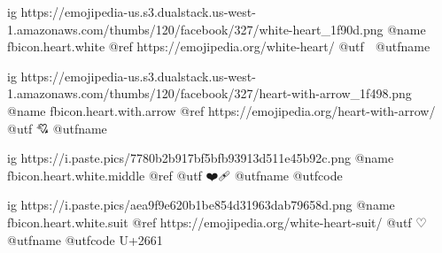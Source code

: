  
 
 
 
 

\ifcmt
	ig https://emojipedia-us.s3.dualstack.us-west-1.amazonaws.com/thumbs/120/facebook/327/white-heart_1f90d.png
	@name fbicon.heart.white
	@ref https://emojipedia.org/white-heart/
	@utf 🤍
	@utfname

	ig https://emojipedia-us.s3.dualstack.us-west-1.amazonaws.com/thumbs/120/facebook/327/heart-with-arrow_1f498.png
	@name fbicon.heart.with.arrow
	@ref https://emojipedia.org/heart-with-arrow/
	@utf 💘
	@utfname

	ig https://i.paste.pics/7780b2b917bf5bfb93913d511e45b92c.png
	@name fbicon.heart.white.middle
	@ref
	@utf ❤️🩹
	@utfname
	@utfcode

	ig https://i.paste.pics/aea9f9e620b1be854d31963dab79658d.png
	@name fbicon.heart.white.suit
	@ref https://emojipedia.org/white-heart-suit/
	@utf ♡
	@utfname
	@utfcode U+2661
	
\fi

